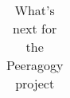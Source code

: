 \begin{table}
{\begin{tabular}{|p{\textwidth}|}
\end{tabular}
}
\caption{What's next for the Peeragogy project\label{tab:WhatsNextSummary}}
\end{table}










\newpage
